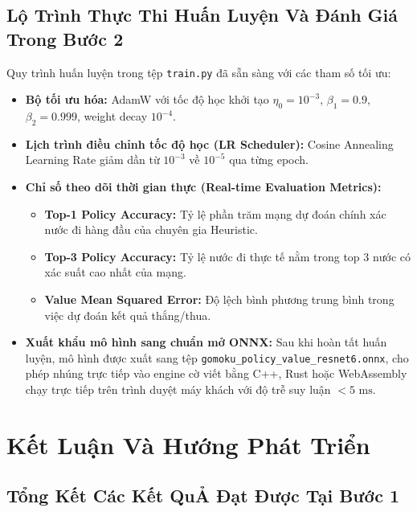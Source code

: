 \documentclass[11pt,a4paper]{report}
\begin{document}
\section{Lộ Trình Thực Thi Huấn Luyện Và Đánh Giá Trong Bước 2}

Quy trình huấn luyện trong tệp \texttt{train.py} đã sẵn sàng với các tham số tối ưu:
\begin{itemize}
    \item \textbf{Bộ tối ưu hóa:} AdamW với tốc độ học khởi tạo $\eta_0 = 10^{-3}$, $\beta_1 = 0.9$, $\beta_2 = 0.999$, weight decay $10^{-4}$.
    \item \textbf{Lịch trình điều chỉnh tốc độ học (LR Scheduler):} Cosine Annealing Learning Rate giảm dần từ $10^{-3}$ về $10^{-5}$ qua từng epoch.
    \item \textbf{Chỉ số theo dõi thời gian thực (Real-time Evaluation Metrics):}
    \begin{itemize}
        \item \textbf{Top-1 Policy Accuracy:} Tỷ lệ phần trăm mạng dự đoán chính xác nước đi hàng đầu của chuyên gia Heuristic.
        \item \textbf{Top-3 Policy Accuracy:} Tỷ lệ nước đi thực tế nằm trong top 3 nước có xác suất cao nhất của mạng.
        \item \textbf{Value Mean Squared Error:} Độ lệch bình phương trung bình trong việc dự đoán kết quả thắng/thua.
    \end{itemize}
    \item \textbf{Xuất khẩu mô hình sang chuẩn mở ONNX:} Sau khi hoàn tất huấn luyện, mô hình được xuất sang tệp \texttt{gomoku\_policy\_value\_resnet6.onnx}, cho phép nhúng trực tiếp vào engine cờ viết bằng C++, Rust hoặc WebAssembly chạy trực tiếp trên trình duyệt máy khách với độ trễ suy luận $< 5\text{ ms}$.
\end{itemize}

\chapter{Kết Luận Và Hướng Phát Triển}

\section{Tổng Kết Các Kết QuẢ Đạt Được Tại Bước 1}
\end{document}
